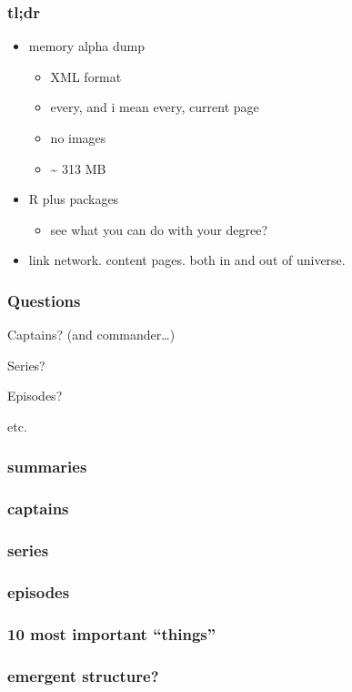 \documentclass{beamer}
\begin{document}
\begin{frame}
  \frametitle{tl;dr}
  \begin{itemize}
    \item memory alpha dump
      \begin{itemize}
        \item XML format
        \item every, and i mean every, current page
        \item no images
        \item \~{} 313 MB
      \end{itemize}
    \item R plus packages
      \begin{itemize}
        \item see what you can do with your degree?
      \end{itemize}
    \item link network. content pages. both in and out of universe.
  \end{itemize}
\end{frame}

\begin{frame}
  \frametitle{Questions}
  \huge{Captains? (and commander\ldots )}

  \huge{Series?}
  
  \huge{Episodes?}

  \huge{etc.}
\end{frame}

\begin{frame}
  \frametitle{summaries}
\end{frame}

\begin{frame}
  \frametitle{captains}
\end{frame}

\begin{frame}
  \frametitle{series}
\end{frame}

\begin{frame}
  \frametitle{episodes}
\end{frame}

\begin{frame}
  \frametitle{10 most important ``things''}
\end{frame}

\begin{frame}
  \frametitle{emergent structure?}
\end{frame}
\end{document}
